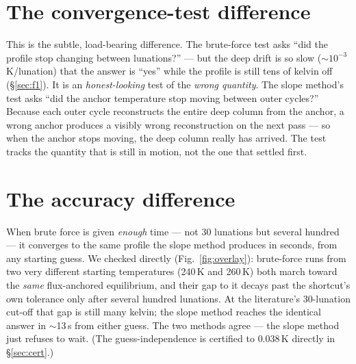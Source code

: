 \documentclass[11pt]{report}
\begin{document}
\section{The convergence-test difference}

This is the subtle, load-bearing difference. The brute-force test asks ``did the
profile stop changing between lunations?'' --- but the deep drift is so slow
($\sim$$10^{-3}$\,K/lunation) that the answer is ``yes'' while the profile is
still tens of kelvin off (\S\ref{sec:f1}). It is an \emph{honest-looking} test of
the \emph{wrong quantity}. The slope method's test asks ``did the anchor
temperature stop moving between outer cycles?'' Because each outer cycle
reconstructs the entire deep column from the anchor, a wrong anchor produces a
visibly wrong reconstruction on the next pass --- so when the anchor stops
moving, the deep column really has arrived. The test tracks the quantity that is
still in motion, not the one that settled first.

\section{The accuracy difference}

When brute force is given \emph{enough} time --- not 30 lunations but several
hundred --- it converges to the same profile the slope method produces in
seconds, from any starting guess. We checked directly (Fig.~\ref{fig:overlay}):
brute-force runs from two very different starting temperatures (240\,K and
260\,K) both march toward the \emph{same} flux-anchored equilibrium, and their
gap to it decays past the shortcut's own tolerance only after several hundred
lunations. At the literature's 30-lunation cut-off that gap is still many kelvin;
the slope method reaches the identical answer in $\sim$13\,s from either guess.
The two methods agree --- the slope method just refuses to wait. (The
guess-independence is certified to $0.038$\,K directly in \S\ref{sec:cert}.)
\end{document}
